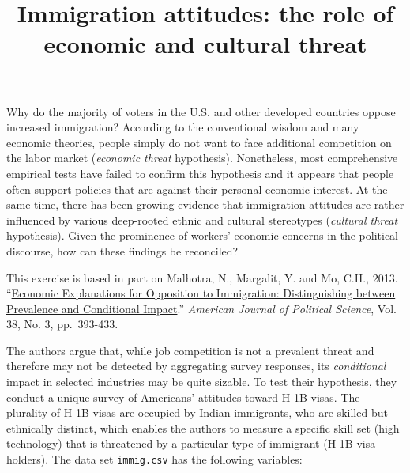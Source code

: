 \documentclass[]{article}
\title{Immigration attitudes: the role of economic and cultural threat}
\author{}
\date{}
\begin{document}
\maketitle


Why do the majority of voters in the U.S. and other developed countries
oppose increased immigration? According to the conventional wisdom and
many economic theories, people simply do not want to face additional
competition on the labor market (\emph{economic threat} hypothesis).
Nonetheless, most comprehensive empirical tests have failed to confirm
this hypothesis and it appears that people often support policies that
are against their personal economic interest. At the same time, there
has been growing evidence that immigration attitudes are rather
influenced by various deep-rooted ethnic and cultural stereotypes
(\emph{cultural threat} hypothesis). Given the prominence of workers'
economic concerns in the political discourse, how can these findings be
reconciled?

This exercise is based in part on Malhotra, N., Margalit, Y. and Mo,
C.H., 2013. ``\href{https://dx.doi.org/10.1111/ajps.12012}{Economic
Explanations for Opposition to Immigration: Distinguishing between
Prevalence and Conditional Impact}.'' \emph{American Journal of
Political Science}, Vol. 38, No. 3, pp.~393-433.

The authors argue that, while job competition is not a prevalent threat
and therefore may not be detected by aggregating survey responses, its
\emph{conditional} impact in selected industries may be quite sizable.
To test their hypothesis, they conduct a unique survey of Americans'
attitudes toward H-1B visas. The plurality of H-1B visas are occupied by
Indian immigrants, who are skilled but ethnically distinct, which
enables the authors to measure a specific skill set (high technology)
that is threatened by a particular type of immigrant (H-1B visa
holders). The data set \texttt{immig.csv} has the following variables:
\end{document}
